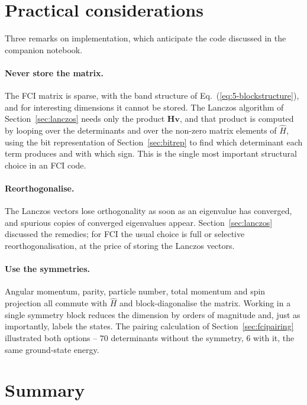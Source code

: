 \section{Practical considerations}
\label{sec:cipractical}

Three remarks on implementation, which anticipate the code discussed in the
companion notebook.

\paragraph{Never store the matrix.}
The FCI matrix is sparse, with the band structure of
Eq.~(\ref{eq:5-blockstructure}), and for interesting dimensions it cannot be
stored.  The Lanczos algorithm of Section~\ref{sec:lanczos} needs only the
product $\bm{H}\bm{v}$, and that product is computed by looping over the
determinants and over the non-zero matrix elements of $\hat{H}$, using the bit
representation of Section~\ref{sec:bitrep} to find which determinant each term
produces and with which sign.  This is the single most important structural
choice in an FCI code.

\paragraph{Reorthogonalise.}
The Lanczos vectors lose orthogonality as soon as an eigenvalue has converged,
and spurious copies of converged eigenvalues appear.  Section~\ref{sec:lanczos}
discussed the remedies; for FCI the usual choice is full or selective
reorthogonalisation, at the price of storing the Lanczos vectors.

\paragraph{Use the symmetries.}
Angular momentum, parity, particle number, total momentum and spin projection
all commute with $\hat{H}$ and block-diagonalise the matrix.  Working in a
single symmetry block reduces the dimension by orders of magnitude and, just
as importantly, labels the states.  The pairing calculation of
Section~\ref{sec:fcipairing} illustrated both options -- $70$ determinants
without the symmetry, $6$ with it, the same ground-state energy.

\section{Summary}
\label{sec:ch5summary}


